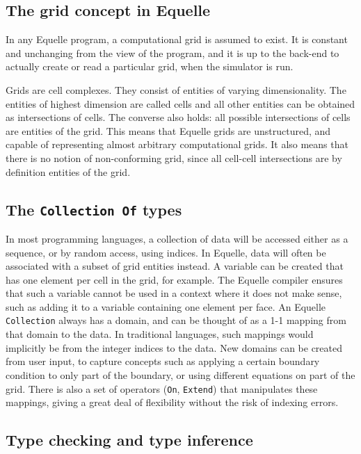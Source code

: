 \documentclass[11pt]{article}
\newcommand{\code}[1]{\texttt{#1}}
\begin{document}
\subsection{The grid concept in Equelle}

In any Equelle program, a computational grid is assumed to exist. It is constant and
unchanging from the view of the program, and it is up to the back-end to actually
create or read a particular grid, when the simulator is run.

Grids are cell complexes. They consist of entities of varying dimensionality. The entities
of highest dimension are called cells and all other entities can be obtained as
intersections of cells. The converse also holds: all possible intersections of cells are
entities of the grid. This means that Equelle grids are unstructured, and capable of
representing almost arbitrary computational grids. It also means that there is no notion
of non-conforming grid, since all cell-cell intersections are by definition entities of
the grid.

\subsection{The \code{Collection Of} types}

In most programming languages, a collection of data will be accessed either as a sequence,
or by random access, using indices. In Equelle, data will often be associated with a
subset of grid entities instead. A variable can be created that has one element per cell
in the grid, for example. The Equelle compiler ensures that such a variable cannot be used
in a context where it does not make sense, such as adding it to a variable containing one
element per face. An Equelle \code{Collection} always has a domain, and can be thought of
as a 1-1 mapping from that domain to the data. In traditional languages, such mappings
would implicitly be from the integer indices to the data. New domains can be created from
user input, to capture concepts such as applying a certain boundary condition to only part
of the boundary, or using different equations on part of the grid. There is also a set of
operators (\code{On}, \code{Extend}) that manipulates these mappings, giving a great deal
of flexibility without the risk of indexing errors.

\subsection{Type checking and type inference}
\end{document}
